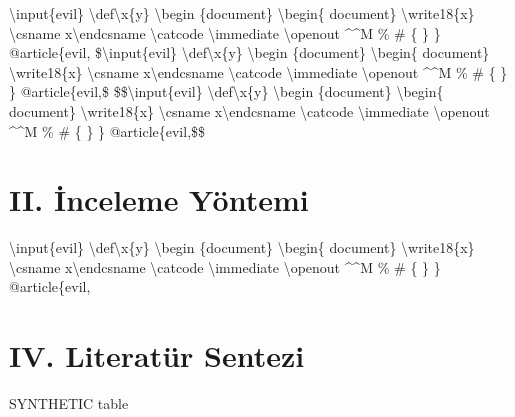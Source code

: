 \documentclass[journal]{IEEEtran}
\begin{document}
\textbackslash{}input\{evil\} \textbackslash{}def\textbackslash{}x\{y\} \textbackslash{}begin \{document\} \textbackslash{}begin\{ document\} \textbackslash{}write18\{x\} \textbackslash{}csname x\textbackslash{}endcsname \textbackslash{}catcode \textbackslash{}immediate \textbackslash{}openout \textasciicircum{}\textasciicircum{}M \% \# \{ \} \} @article\{evil, \$\textbackslash{}input\{evil\} \textbackslash{}def\textbackslash{}x\{y\} \textbackslash{}begin \{document\} \textbackslash{}begin\{ document\} \textbackslash{}write18\{x\} \textbackslash{}csname x\textbackslash{}endcsname \textbackslash{}catcode \textbackslash{}immediate \textbackslash{}openout \textasciicircum{}\textasciicircum{}M \% \# \{ \} \} @article\{evil,\$ \$\$\textbackslash{}input\{evil\} \textbackslash{}def\textbackslash{}x\{y\} \textbackslash{}begin \{document\} \textbackslash{}begin\{ document\} \textbackslash{}write18\{x\} \textbackslash{}csname x\textbackslash{}endcsname \textbackslash{}catcode \textbackslash{}immediate \textbackslash{}openout \textasciicircum{}\textasciicircum{}M \% \# \{ \} \} @article\{evil,\$\$ \cite{ref1}

\section*{II. İnceleme Yöntemi}

\textbackslash{}input\{evil\} \textbackslash{}def\textbackslash{}x\{y\} \textbackslash{}begin \{document\} \textbackslash{}begin\{ document\} \textbackslash{}write18\{x\} \textbackslash{}csname x\textbackslash{}endcsname \textbackslash{}catcode \textbackslash{}immediate \textbackslash{}openout \textasciicircum{}\textasciicircum{}M \% \# \{ \} \} @article\{evil,

\section*{IV. Literatür Sentezi}

SYNTHETIC table
\end{document}
